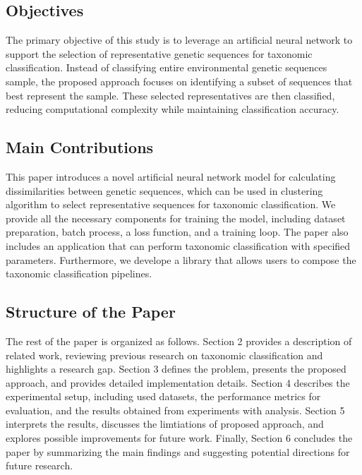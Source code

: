\documentclass{article}
\begin{document}
        \subsection{Objectives}
    
            The primary objective of this study is to leverage an artificial neural network to support the selection of representative genetic sequences for taxonomic classification. Instead of classifying entire environmental genetic sequences sample, the proposed approach focuses on identifying a subset of sequences that best represent the sample. These selected representatives are then classified, reducing computational complexity while maintaining classification accuracy.

        \subsection{Main Contributions}

            This paper introduces a novel artificial neural network model for calculating dissimilarities between genetic sequences, which can be used in clustering algorithm to select representative sequences for taxonomic classification. We provide all the necessary components for training the model, including dataset preparation, batch process, a loss function, and a training loop. The paper also includes an application that can perform taxonomic classification with specified parameters. Furthermore, we develope a library that allows users to compose the taxonomic classification pipelines.

        \subsection{Structure of the Paper}

            The rest of the paper is organized as follows. Section 2 provides a description of related work, reviewing previous research on taxonomic classification and highlights a research gap. Section 3 defines the problem, presents the proposed approach, and provides detailed implementation details. Section 4 describes the experimental setup, including used datasets, the performance metrics for evaluation, and the results obtained from experiments with analysis. Section 5 interprets the results, discusses the limtiations of proposed approach, and explores possible improvements for future work. Finally, Section 6 concludes the paper by summarizing the main findings and suggesting potential directions for future research.
\end{document}
